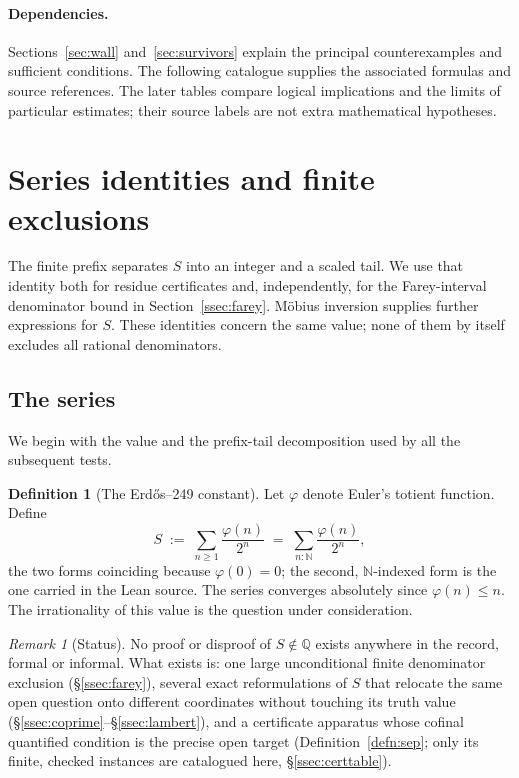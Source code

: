 \documentclass[11pt]{article}
\theoremstyle{plain}
\theoremstyle{definition}
\newtheorem{defn}[thm]{Definition}
\theoremstyle{remark}
\newtheorem{rem}[thm]{Remark}
\begin{document}
\paragraph{Dependencies.} Sections~\ref{sec:wall} and~\ref{sec:survivors} explain the principal
counterexamples and sufficient conditions. The following catalogue supplies
the associated formulas and source references. The later tables compare
logical implications and the limits of particular estimates; their source
labels are not extra mathematical hypotheses.
\section{Series identities and finite exclusions}\label{sec:series}

The finite prefix separates $S$ into an integer and a scaled tail.
We use that identity both for residue certificates and, independently,
for the Farey-interval denominator bound in Section~\ref{ssec:farey}.
M\"obius inversion supplies further expressions for $S$. These
identities concern the same value; none of them by itself excludes
all rational denominators.

\subsection{The series}

We begin with the value and the prefix-tail decomposition used by
all the subsequent tests.

\begin{defn}[The Erd\H{o}s--249 constant]
\label{defn:S}
Let $\varphi$ denote Euler's totient function. Define
\[
S \;:=\; \sum_{n \ge 1} \frac{\varphi(n)}{2^{n}} \;=\; \sum_{n : \mathbb{N}} \frac{\varphi(n)}{2^{n}},
\]
the two forms coinciding because $\varphi(0)=0$; the second, $\mathbb{N}$-indexed
form is the one carried in the Lean source. The series converges absolutely
since $\varphi(n)\le n$. The irrationality of this value is the question
under consideration.
\end{defn}

\begin{rem}[Status]
No proof or disproof of $S\notin\mathbb Q$ exists anywhere in the record,
formal or informal. What exists is: one large unconditional finite denominator
exclusion (\S\ref{ssec:farey}), several exact reformulations of $S$ that
relocate the same open question onto different coordinates without touching
its truth value (\S\ref{ssec:coprime}--\S\ref{ssec:lambert}), and a certificate
apparatus whose cofinal quantified condition is the precise open target
(Definition~\ref{defn:sep}; only its finite, checked instances
are catalogued here, \S\ref{ssec:certtable}).
\end{rem}
\end{document}

